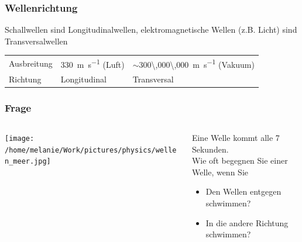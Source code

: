 \documentclass{beamer}
\begin{document}
\begin{frame}
\frametitle{Wellenrichtung}
Schallwellen sind Longitudinalwellen, elektromagnetische Wellen (z.B. Licht) sind Transversalwellen \\[1cm]

\pause

\begin{tabular}{|l|l|l|}
\hline
        & \color{theme}{\textbf{Schallwellen}}  & \color{theme}{\textbf{Elektromagnetische Wellen}}     \\
\hline
Ausbreitung       & \SI{330}{\meter\per\second} (Luft)  &  \(\sim\)\SI{300\,000\,000}{\meter\per\second} (Vakuum)   \\
\hline
Richtung        & Longitudinal  & Transversal   \\
\hline
\end{tabular}

\end{frame}






\begin{frame}
\frametitle{Frage}

\begin{columns}[c]

\begin{column}{5cm}
\begin{center}
\texttt{[image: /home/melanie/Work/pictures/physics/wellen\_meer.jpg]}
\end{center}

\end{column}


\begin{column}{5cm}

Eine Welle kommt alle 7 Sekunden. \\[0.5 cm]

Wie oft begegnen Sie einer Welle, wenn Sie


\begin{itemize}
\item
Den Wellen entgegen schwimmen?
\item
In die andere Richtung schwimmen?
\end{itemize}


\end{column}


\end{columns}

\end{frame}
\end{document}
